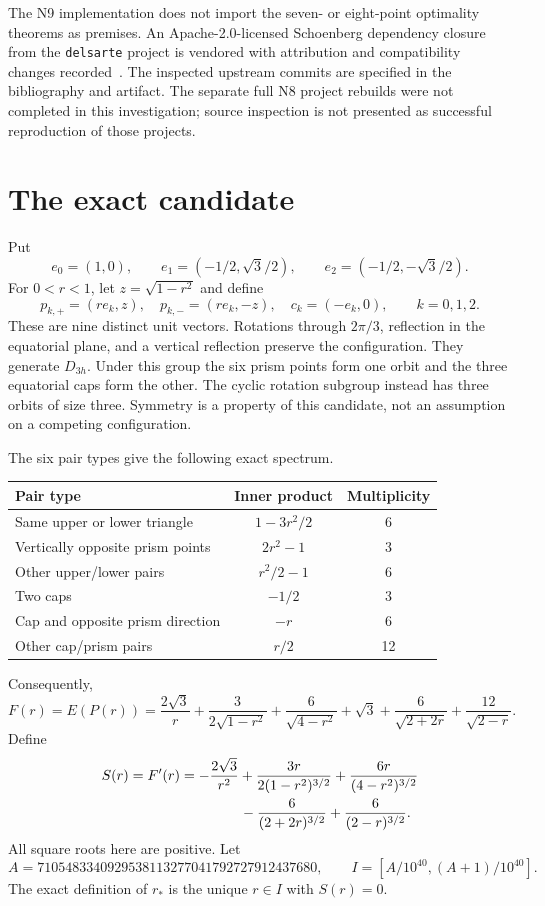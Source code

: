\documentclass[11pt]{article}
\theoremstyle{remark}
\newcommand{\code}[1]{{\small\nolinkurl{#1}}}
\begin{document}
The N9 implementation does not import the seven- or eight-point optimality
theorems as premises. An Apache-2.0-licensed Schoenberg dependency closure from
the \code{delsarte} project is vendored with attribution and compatibility
changes recorded~\cite{delsarte}. The inspected upstream commits are specified
in the bibliography and artifact. The separate full N8 project rebuilds were
not completed in this investigation; source inspection is not presented as
successful reproduction of those projects.

\section{The exact candidate}\label{sec:candidate}
Put
\[
 e_0=(1,0),\qquad e_1=(-1/2,\sqrt3/2),\qquad
 e_2=(-1/2,-\sqrt3/2).
\]
For $0<r<1$, let $z=\sqrt{1-r^2}$ and define
\begin{equation}\label{eq:candidate}
 p_{k,+}=(re_k,z),\quad p_{k,-}=(re_k,-z),\quad
 c_k=(-e_k,0),\qquad k=0,1,2.
\end{equation}
These are nine distinct unit vectors. Rotations through $2\pi/3$, reflection
in the equatorial plane, and a vertical reflection preserve the configuration.
They generate $D_{3h}$. Under this group the six prism points form one orbit
and the three equatorial caps form the other. The cyclic rotation subgroup
instead has three orbits of size three. Symmetry is a property of this
candidate, not an assumption on a competing configuration.

The six pair types give the following exact spectrum.
\begin{center}
\begin{tabular}{lcc}
\toprule
Pair type & Inner product & Multiplicity\\
\midrule
Same upper or lower triangle & $1-3r^2/2$ & 6\\
Vertically opposite prism points & $2r^2-1$ & 3\\
Other upper/lower pairs & $r^2/2-1$ & 6\\
Two caps & $-1/2$ & 3\\
Cap and opposite prism direction & $-r$ & 6\\
Other cap/prism pairs & $r/2$ & 12\\
\bottomrule
\end{tabular}
\end{center}
Consequently,
\begin{equation}\label{eq:familyenergy}
 F(r)=E(P(r))=
 \frac{2\sqrt3}{r}+\frac3{2\sqrt{1-r^2}}+
 \frac6{\sqrt{4-r^2}}+\sqrt3+
 \frac6{\sqrt{2+2r}}+\frac{12}{\sqrt{2-r}}.
\end{equation}
Define
\begin{align}\label{eq:stationarity}
 S(r)=F'(r)
 &= -\frac{2\sqrt3}{r^2}+\frac{3r}{2(1-r^2)^{3/2}}
    +\frac{6r}{(4-r^2)^{3/2}}\notag\\
 &\hspace{15mm}-\frac6{(2+2r)^{3/2}}+\frac6{(2-r)^{3/2}}.
\end{align}
All square roots here are positive. Let
\[
 A=7105483340929538113277041792727912437680,\qquad
 I=[A/10^{40},(A+1)/10^{40}].
\]
The exact definition of $r_*$ is the unique $r\in I$ with $S(r)=0$.
\end{document}
